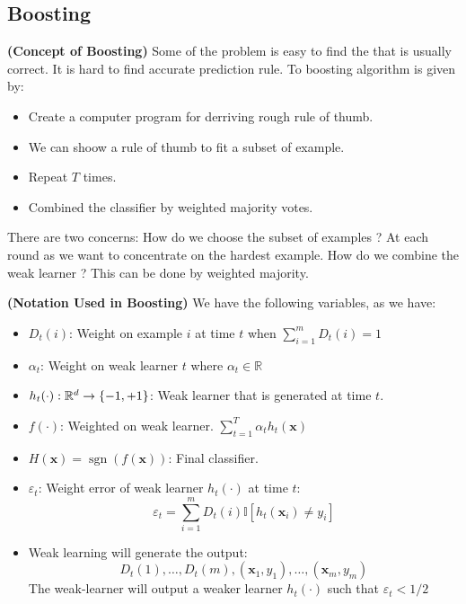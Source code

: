 \subsection{Boosting}

\begin{remark}{\textbf{(Concept of Boosting)}}
    Some of the problem is easy to find the  that is usually correct. It is hard to find accurate prediction rule. To boosting algorithm is given by:
    \begin{itemize}
        \item Create a computer program for derriving rough rule of thumb. 
        \item We can shoow a rule of thumb to fit a subset of example. 
        \item Repeat $T$ times. 
        \item Combined the classifier by weighted majority votes. 
    \end{itemize}
    There are two concerns: How do we choose the subset of examples ? At each round as we want to concentrate on the hardest example. How do we combine the weak learner ? This can be done by weighted majority. 
\end{remark}

\begin{definition}{\textbf{(Notation Used in Boosting)}}
    We have the following variables, as we have:
    \begin{itemize}
        \item $D_t(i)$: Weight on example $i$ at time $t$ when $\sum^m_{i=1}D_t(i) = 1$
        \item $\alpha_t$: Weight on weak learner $t$ where $\alpha_t \in \mathbb{R}$
        \item $h_t(\cdot) : \mathbb{R}^d \rightarrow \left\{ -1, +1 \right\}$: Weak learner that is generated at time $t$. 
        \item $f(\cdot)$: Weighted on weak learner. $\sum^T_{t=1}\alpha_th_t(\boldsymbol x)$
        \item $H(\boldsymbol x) = \operatorname{sgn}(f(\boldsymbol x))$: Final classifier.
        \item $\varepsilon_t$: Weight error of weak learner $h_t(\cdot)$ at time $t$:
        \begin{equation*}
            \varepsilon_t = \sum^m_{i=1}D_t(i)\mathbb{I}[h_t(\boldsymbol x_i) \ne y_i]
        \end{equation*}
        \item Weak learning will generate the output:
        \begin{equation*}
            D_t(1),\dots,D_t(m),(\boldsymbol x_1,y_1),\dots,(\boldsymbol x_m, y_m)
        \end{equation*}
        The weak-learner will output a weaker learner $h_t(\cdot)$ such that $\varepsilon_t < 1/2$
    \end{itemize} 
\end{definition}

